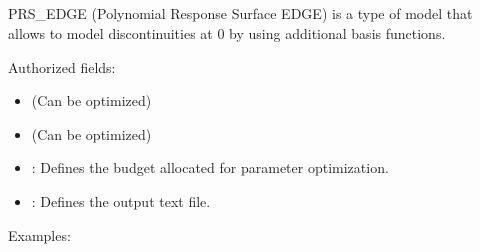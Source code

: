 \documentclass[letterpaper,10pt,english]{sphinxmanual}
\begin{document}
\subsection{}
\label{\detokenize{SgteLib:prs-edge}}\label{\detokenize{SgteLib:id2}}
\begin{DUlineblock}{0em}
\item[] PRS\_EDGE (Polynomial Response Surface EDGE) is a type of model that allows to model discontinuities at \(0\) by using additional basis functions.
\item[] Authorized fields:
\end{DUlineblock}
\begin{itemize}
\item {} 
\sphinxAtStartPar
{\hyperref[\detokenize{SgteLib:degree}]{}} (Can be optimized)

\item {} 
\sphinxAtStartPar
{\hyperref[\detokenize{SgteLib:ridge}]{}} (Can be optimized)

\item {} 
\sphinxAtStartPar
{\hyperref[\detokenize{SgteLib:budget}]{}}: Defines the budget allocated for parameter optimization.

\item {} 
\sphinxAtStartPar
{\hyperref[\detokenize{SgteLib:output}]{}}: Defines the output text file.

\end{itemize}

\begin{DUlineblock}{0em}
\item[] Examples:
\item[] 
\item[] 
\end{DUlineblock}
\end{document}
